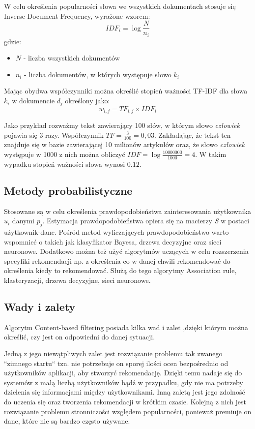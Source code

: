 W celu określenia popularności słowa we wszystkich dokumentach stosuje się Inverse Document Frequency, wyrażone wzorem:
\begin{equation}
IDF_i = \log{\frac{N}{n_i}}
\end{equation}
gdzie:
\begin{itemize}
	\item[] $N$ - liczba wszystkich dokumentów
	\item[] $n_i$ - liczba dokumentów, w których występuje słowo $k_i$
\end{itemize}

Mając obydwa współczynniki można określić stopień ważności TF-IDF dla słowa $k_i$ w dokumencie $d_j$ określony jako:
\begin{equation}
w_{i,j} = TF_{i,j} \times IDF_i
\end{equation}

Jako przykład rozważmy tekst zawierający 100 słów, w którym słowo \textit{człowiek} pojawia się 3 razy. Współczynnik $TF = \frac{3}{100} = 0,03$. Zakładając, że tekst ten znajduje się w bazie zawierającej 10 milionów artykułów oraz, że słowo \textit{człowiek} występuje w 1000 z nich można obliczyć $IDF = \log{\frac{10000000}{1000}} = 4$. W takim wypadku stopień ważności słowa wynosi $0.12$.

\subsection{Metody probabilistyczne}
Stosowane są w celu określenia prawdopodobieństwa zainteresowania użytkownika $u_i$ danymi $p_j$. Estymacja prawdopodobieństwa opiera się na macierzy \textit{S} w postaci użytkownik-dane. Pośród metod wyliczających prawdopodobieństwo warto wspomnieć o takich jak klasyfikator Bayesa, drzewa decyzyjne oraz sieci neuronowe.  Dodatkowo można też użyć algorytmów uczących w celu rozszerzenia specyfiki rekomendacji np. z określenia co w danej chwili rekomendować do określenia kiedy to rekomendować. Służą do tego algorytmy Association rule, klasteryzacji, drzewa decyzyjne, sieci neuronowe.  

\subsection{Wady i zalety}

Algorytm Content-based filtering posiada kilka wad i zalet ,dzięki którym można określić, czy jest on odpowiedni do danej sytuacji. 

Jedną z jego niewątpliwych zalet jest rozwiązanie problemu tak zwanego ``zimnego startu`` tzn. nie potrzebuje on sporej ilości ocen bezpośrednio od użytkowników aplikacji, aby stworzyć rekomendację. Dzięki temu nadaje się do systemów z małą liczbą użytkowników bądź w przypadku, gdy nie ma potrzeby dzielenia się informacjami między użytkownikami. Inną zaletą jest jego zdolność do uczenia się oraz tworzenia rekomendacji w krótkim czasie. Kolejną z nich jest rozwiązanie problemu stronniczości względem popularności, ponieważ premiuje on dane, które nie są bardzo często używane. 

